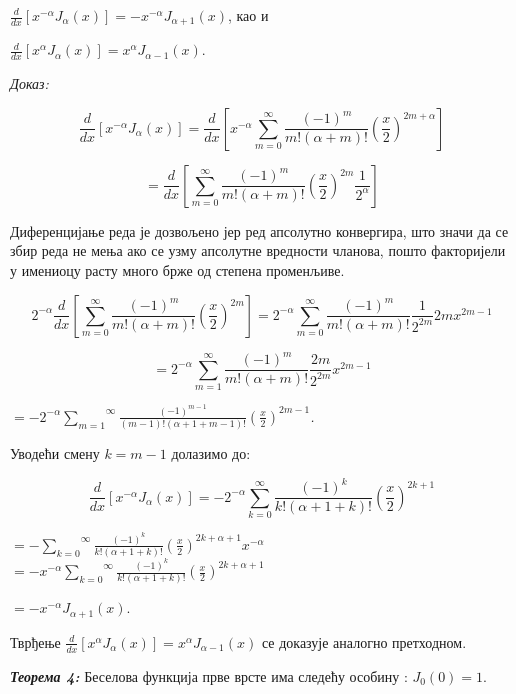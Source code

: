 \(\frac{d}{dx}\left\lbrack x^{- \alpha}J_{\alpha}(x) \right\rbrack = - x^{- \alpha}J_{\alpha + 1}(x)\),
као и

\(\frac{d}{dx}\left\lbrack x^{\alpha}J_{\alpha}(x) \right\rbrack = x^{\alpha}J_{\alpha - 1}(x)\).

\emph{Доказ:}

\[\frac{d}{dx}\left\lbrack x^{- \alpha}J_{\alpha}(x) \right\rbrack = \frac{d}{dx}\left\lbrack x^{- \alpha}\overset{\infty}{\sum_{m = 0}}\frac{{( - 1)}^{m}}{m!(\alpha + m)!}\left( \frac{x}{2} \right)^{2m + \alpha} \right\rbrack\]

\[= \frac{d}{dx}\left\lbrack \overset{\infty}{\sum_{m = 0}}\frac{{( - 1)}^{m}}{m!(\alpha + m)!}\left( \frac{x}{2} \right)^{2m}\frac{1}{2^{\alpha}} \right\rbrack\]

Диференцијање реда је дозвољено јер ред апсолутно конвергира, што значи
да се збир реда не мења ако се узму апсолутне вредности чланова, пошто
факторијели у имениоцу расту много брже од степена променљиве.

\[2^{- \alpha}\frac{d}{dx}\left\lbrack \overset{\infty}{\sum_{m = 0}}\frac{{( - 1)}^{m}}{m!(\alpha + m)!}\left( \frac{x}{2} \right)^{2m} \right\rbrack = 2^{- \alpha}\overset{\infty}{\sum_{m = 0}}\frac{{( - 1)}^{m}}{m!(\alpha + m)!}\frac{1}{2^{2m}}2mx^{2m - 1}\]

\[= 2^{- \alpha}\overset{\infty}{\sum_{m = 1}}\frac{{( - 1)}^{m}}{m!(\alpha + m)!}\frac{2m}{2^{2m}}x^{2m - 1}\]

\(= - 2^{- \alpha}\overset{\infty}{\sum_{m = 1}}\frac{{( - 1)}^{m - 1}}{(m - 1)!(\alpha + 1 + m - 1)!}\left( \frac{x}{2} \right)^{2m - 1}\)\emph{.}

Уводећи смену \(k = m - 1\) долазимо до:

\[\frac{d}{dx}\left\lbrack x^{- \alpha}J_{\alpha}(x) \right\rbrack = - 2^{- \alpha}\overset{\infty}{\sum_{k = 0}}\frac{{( - 1)}^{k}}{k!(\alpha + 1 + k)!}\left( \frac{x}{2} \right)^{2k + 1}\]

\(= - \overset{\infty}{\sum_{k = 0}}\frac{{( - 1)}^{k}}{k!(\alpha + 1 + k)!}\left( \frac{x}{2} \right)^{2k + \alpha + 1}x^{- \alpha}\)
\(= - x^{- \alpha}\overset{\infty}{\sum_{k = 0}}\frac{{( - 1)}^{k}}{k!(\alpha + 1 + k)!}\left( \frac{x}{2} \right)^{2k + \alpha + 1}\)

\(= - x^{- \alpha}J_{\alpha + 1}(x)\).

Тврђење
\(\frac{d}{dx}\left\lbrack x^{\alpha}J_{\alpha}(x) \right\rbrack = x^{\alpha}J_{\alpha - 1}(x)\)
се доказује аналогно претходном.

\emph{\textbf{Теорема 4:}} Беселова функција прве врсте има следећу
особину : \(J_{0}(0) = 1\).

